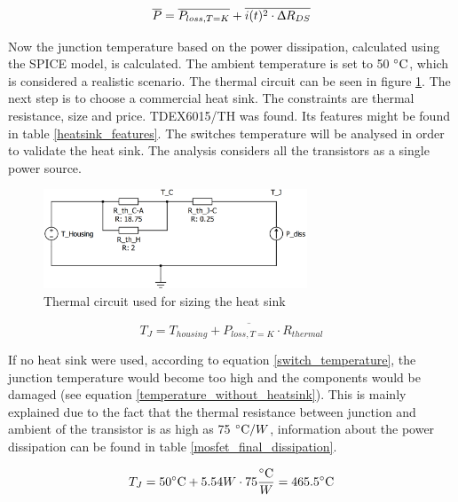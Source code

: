 \begin{equation} \label{total_losses}
\overline{P} = \overline{P_{loss, T = K}} + \overline{i(t)^2 \cdot \Updelta R_{DS}}
\end{equation}

Now the junction temperature based on the power dissipation, calculated using the SPICE model, is calculated. The ambient temperature is set to 50 $\decC$, which is considered a realistic scenario. The thermal circuit can be seen in figure \ref{thermal_circuit}. The next step is to choose a commercial heat sink. The constraints are thermal resistance, size and price. TDEX6015/TH was found. Its features might be found in table \ref{heatsink_features}. The switches temperature will be analysed in order to validate the heat sink. The analysis considers all the transistors as a single power source.

\begin{figure}[H]
	\begin{center}
		\includegraphics[width=0.7\textwidth]{../Pictures/thermal_circuit.png}
		\caption{Thermal circuit used for sizing the heat sink}
		\label{thermal_circuit}
	\end{center}	
\end{figure}

\begin{equation} \label{switch_temperature}
T_{J} = T_{housing} + \overline{P_{loss, T = K}} \cdot  R_{thermal}
\end{equation}


If no heat sink were used, according to equation \ref{switch_temperature}, the junction temperature would become too high and the components would be damaged (see equation \ref{temperature_without_heatsink}). This is mainly explained due to the fact that the thermal resistance between junction and ambient of the transistor is as high as 75 $\decC / W$, information about the power dissipation can be found in table \ref{mosfet_final_dissipation}.

\begin{equation} \label{temperature_without_heatsink}
T_{J} = 50 \decC + 5.54 W \cdot 75 \frac{\decC}{W} = 465.5 \decC
\end{equation}


